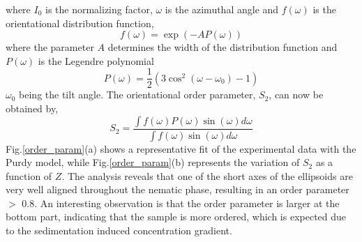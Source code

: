 \documentclass[aps,prl,preprint,superscriptaddress]{revtex4-1} %
\begin{document}
\noindent where $I_0$ is the normalizing factor, $\omega$ is the azimuthal angle and $f(\omega)$ is the orientational distribution function,
\begin{equation}
\label{eq3:}
f(\omega)=\exp(-AP(\omega))
\end{equation} 
\noindent where the parameter $A$ determines the width of the distribution function and $P(\omega)$ is the Legendre polynomial
\begin{equation}
\label{eq4:}
P(\omega)=\frac{1}{2}(3\cos^2(\omega-\omega_0)-1)
\end{equation} 
\noindent $\omega_0$ being the tilt angle. The orientational order parameter, $S_2$, can now be obtained by,
\begin{equation}
\label{eq5:}
S_2= \frac{\int f(\omega)P(\omega)\sin(\omega)d\omega}{\int f(\omega)\sin(\omega)d\omega}
\end{equation}
\noindent Fig.\ref{order_param}(a) shows a representative fit of the experimental data with the Purdy model, while Fig.\ref{order_param}(b) represents the variation of $S_2$ as a function of $Z$. The analysis reveals that one of the short axes of the ellipsoids are very well aligned throughout the nematic phase, resulting in an order parameter $>$ 0.8. An interesting observation is that the order parameter is larger at the bottom part, indicating that the sample is more ordered, which is expected due to the sedimentation induced concentration gradient.\par
\end{document}
